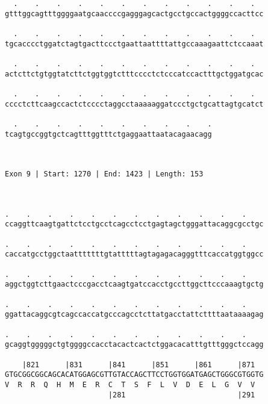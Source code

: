 \documentclass{article}
\begin{document}
\begin{Verbatim}
  .    .    .    .    .    .    .    .    .    .    .    .  
gtttggcagtttggggaatgcaaccccgagggagcactgcctgccactggggccacttcc
                                                            
  .    .    .    .    .    .    .    .    .    .    .    .  
tgcacccctggatctagtgacttccctgaattaattttattgccaaagaattctccaaat
                                                            
  .    .    .    .    .    .    .    .    .    .    .    .  
actcttctgtggtatcttctggtggtctttcccctctcccatccactttgctggatgcac
                                                            
  .    .    .    .    .    .    .    .    .    .    .    .  
cccctcttcaagccactctcccctaggcctaaaaaggatccctgctgcattagtgcatct
                                                            
  .    .    .    .    .    .    .    .    .    .
tcagtgccggtgctcagtttggtttctgaggaattaatacagaacagg
                                                
                                                
 
Exon 9 | Start: 1270 | End: 1423 | Length: 153



.    .    .    .    .    .    .    .    .    .    .    .    
ccaggttcaagtgattctcctgcctcagcctcctgagtagctgggattacaggcgcctgc
                                                            
.    .    .    .    .    .    .    .    .    .    .    .    
caccatgcctggctaatttttttgtatttttagtagagacagggtttcaccatggtggcc
                                                            
.    .    .    .    .    .    .    .    .    .    .    .    
aggctggtcttgaactcccgacctcaagtgatccacctgccttggcttcccaaagtgctg
                                                            
.    .    .    .    .    .    .    .    .    .    .    .    
ggattacaggcgtcagccaccatgcccagcctcttatgacctattcttttaataaaagag
                                                            
.    .    .    .    .    .    .    .    .    .    .    .    
gcaggtgggggctgtggggccacctacactcactctggacacatttgtttgggctccagg
                                                            
    |821      |831      |841      |851      |861      |871  
GTGCGGCGGCAGCACATGGAGCGTTGTACCAGCTTCCTGGTGGATGAGCTGGGCGTGGTG
V  R  R  Q  H  M  E  R  C  T  S  F  L  V  D  E  L  G  V  V  
                        |281                          |291  
  

\end{Verbatim}
\end{document}
